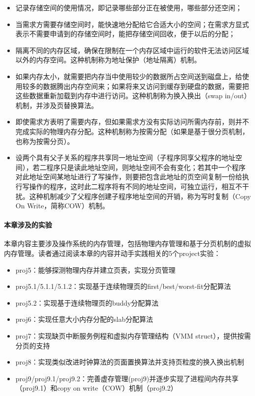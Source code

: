\begin{itemize}
	\item
	记录存储空间的使用情况，即记录哪些部分正在被使用，哪些部分还空闲；
	\item
	当需求方需要存储空间时，能快速地分配给它合适大小的空间；在需求方显式表示不需要申请到的存储空间时，能把存储空间回收，便于以后的分配；
	\item
	隔离不同的内存区域，确保在限制在一个内存区域中运行的软件无法访问区域以外的内存空间。这种机制称为地址保护（地址隔离）机制。
	\item
	如果内存太小，就需要把内存当中使用较少的数据所占空间送到磁盘上，给使用较多的数据腾出内存空间来；如果将来又访问到缓存到硬盘的数据，需要把这些数据重新加载到内存中进行访问。这种机制称为换入换出（swap
	in/out）机制，并涉及页替换算法。
	\item
	即使需求方表明了需要内存，但如果需求方没有实际访问所需内存前，则并不完成实际的物理内存分配。这种机制称为按需分配（如果是基于很分页机制，也称为按需分页）。
	\item
	设两个具有父子关系的程序共享同一地址空间（子程序同享父程序的地址空间），若二程序只是读此地址空间，则地址空间不会有变化；若其中一个程序对此地址空间某地址进行了写操作，则要把包含此地址的页空间复制一份给执行写操作的程序，这时此二程序将有不同的地址空间，可独立运行，相互不干扰。这种机制减少了父程序创建子程序地址空间的开销，称为写时复制（Copy
	On Write，简称COW）机制。
\end{itemize}

\paragraph{本章涉及的实验}

本章内容主要涉及操作系统的内存管理，包括物理内存管理和基于分页机制的虚拟内存管理。读者通过阅读本章的内容并动手实践相关的5个project实验：

\begin{itemize}
	\item
	proj5：能够探测物理内存并建立页表，实现分页管理
	\item
	proj5.1/5.1.1/5.1.2：实现基于连续物理页的first/best/worst-fit分配算法
	\item
	proj5.2：实现基于连续物理页的buddy分配算法
	\item
	proj6：实现任意大小内存分配的slab分配算法
	\item
	proj7：实现缺页中断服务例程和虚拟内存管理结构（VMM
	struct），提供按需分页的支持
	\item
	proj8：实现类似改进时钟算法的页面置换算法并支持页粒度的换入换出机制
	\item
	proj9/proj9.1/proj9.2：完善虚存管理(proj9)并逐步实现了进程间内存共享（proj9.1）和copy
	on write（COW）机制（proj9.2）
\end{itemize}



